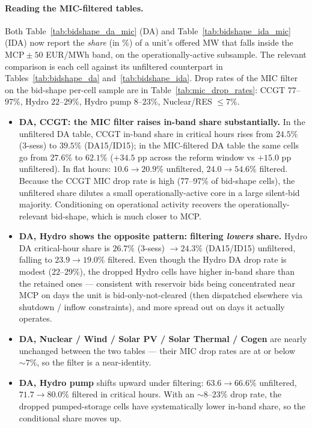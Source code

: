 \documentclass[11pt,a4paper]{article}
\begin{document}
\paragraph{Reading the MIC-filtered tables.} Both Table~\ref{tab:bidshape_da_mic} (DA) and Table~\ref{tab:bidshape_ida_mic} (IDA) now report the \emph{share} (in \%) of a unit's offered MW that falls inside the $\text{MCP}\pm 50$ EUR/MWh band, on the operationally-active subsample. The relevant comparison is each cell against its unfiltered counterpart in Tables~\ref{tab:bidshape_da} and~\ref{tab:bidshape_ida}. Drop rates of the MIC filter on the bid-shape per-cell sample are in Table~\ref{tab:mic_drop_rates}: CCGT $77$--$97\%$, Hydro $22$--$29\%$, Hydro pump $8$--$23\%$, Nuclear/RES $\le 7\%$.
\begin{itemize}
\item \textbf{DA, CCGT: the MIC filter raises in-band share substantially.} In the unfiltered DA table, CCGT in-band share in critical hours rises from $24.5\%$ (3-sess) to $39.5\%$ (DA15/ID15); in the MIC-filtered DA table the same cells go from $27.6\%$ to \textbf{$62.1\%$} ($+34.5$ pp across the reform window vs $+15.0$ pp unfiltered). In flat hours: $10.6\to 20.9\%$ unfiltered, $24.0\to 54.6\%$ filtered. Because the CCGT MIC drop rate is high (77--97\% of bid-shape cells), the unfiltered share dilutes a small operationally-active core in a large silent-bid majority. Conditioning on operational activity recovers the operationally-relevant bid-shape, which is much closer to MCP.
\item \textbf{DA, Hydro shows the opposite pattern: filtering \emph{lowers} share.} Hydro DA critical-hour share is $26.7\%$ (3-sess) $\to 24.3\%$ (DA15/ID15) unfiltered, falling to $23.9\to 19.0\%$ filtered. Even though the Hydro DA drop rate is modest ($22$--$29\%$), the dropped Hydro cells have higher in-band share than the retained ones --- consistent with reservoir bids being concentrated near MCP on days the unit is bid-only-not-cleared (then dispatched elsewhere via shutdown / inflow constraints), and more spread out on days it actually operates.
\item \textbf{DA, Nuclear / Wind / Solar PV / Solar Thermal / Cogen} are nearly unchanged between the two tables --- their MIC drop rates are at or below $\sim 7\%$, so the filter is a near-identity.
\item \textbf{DA, Hydro pump} shifts upward under filtering: $63.6\to 66.6\%$ unfiltered, $71.7\to 80.0\%$ filtered in critical hours. With an $\sim 8$--$23\%$ drop rate, the dropped pumped-storage cells have systematically lower in-band share, so the conditional share moves up.

\end{itemize}
\end{document}
